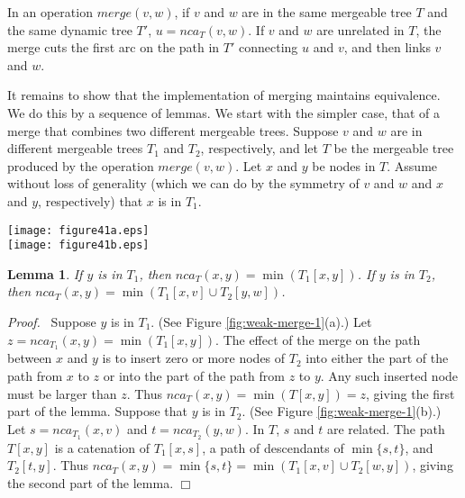 \documentclass[twoside,leqno,twocolumn]{article}
\newtheorem{lemma}{Lemma}
\newcommand{\proof}{\noindent \emph{Proof.}\ }
\newcommand{\proofend}{$\Box$\\}
\newcommand{\merge}{\mathit{merge}}
\newcommand{\nca}{\mathit{nca}}
\newcommand{\rootn}{\mathit{root}}
\begin{document}
In an operation $\merge(v, w)$, if $v$ and $w$ are in the same mergeable tree $T$ and the same dynamic tree $T'$,  $u = \nca_T(v, w)$.  If $v$ and $w$ are unrelated in $T$, the merge cuts the first arc on the path in $T'$ connecting $u$ and $v$, and then links $v$ and $w$.

It remains to show that the implementation of merging maintains equivalence.  We do this by a sequence of lemmas. We start with the simpler case, that of a merge that combines two different mergeable trees.  Suppose $v$ and $w$ are in different mergeable trees $T_1$ and $T_2$, respectively, and let $T$ be the mergeable tree produced by the operation $\merge(v, w)$.  Let $x$ and $y$ be nodes in $T$.  Assume without loss of generality (which we can do by the symmetry of $v$ and $w$ and $x$ and $y$, respectively) that $x$ is in $T_1$.



\begin{figure*}[tb]
\begin{center}
\resizebox{1.\textwidth}{!} {\texttt{[image: figure41a.eps]}}\\
\vspace{1cm} \resizebox{1.\textwidth}{!}
{\texttt{[image: figure41b.eps]}}
\end{center}
\caption{\label{fig:weak-merge-1} Proof of Lemma~\ref{lem:weak1}.  Nodes in the tree containing $v$ are black and nodes in the tree containing $w$ are white. Grey nodes can be either black or white depending on the node labels. Solid lines are single arcs; wavy lines are tree paths. (a) Node $y$ is in $T_1$. Here we assume $t<z<t'<s$.  After the merge, $\min \{v,w\}$ is on $T[t',\max\{v,w\}]$ and $\max \{\rootn(T_1),\rootn(T_2)\}$ is on $T[\min \{\rootn(T_1),\rootn(T_2)\},z]$. (b) Node $y$ is in $T_2$. Here we assume $s<t$.  After the merge, $\min \{v,w\}$ is on $T[s,\max\{v,w\}]$ and $\max \{\rootn(T_1),\rootn(T_2)\}$ is on $T[\min \{\rootn(T_1),\rootn(T_2)\},t]$.}
\end{figure*}


\begin{lemma}
\label{lem:weak1} If $y$ is in $T_1$, then $\nca_T(x, y) = \min(T_1[x,y])$.  If $y$ is in $T_2$, then $\nca_T(x, y) = \min(T_1[x, v] \cup T_2[y, w])$.
\end{lemma}
\proof
Suppose $y$ is in $T_1$. (See Figure \ref{fig:weak-merge-1}(a).) Let $z = \nca_{T_1}(x, y) = \min(T_1[x, y])$. The effect of the merge on the path between $x$ and $y$ is to insert zero or more nodes of $T_2$ into either the part of the path from $x$ to $z$ or into the part of the path from $z$ to $y$.  Any such inserted node must be larger than $z$.  Thus $\nca_{T}(x, y) = \min(T[x, y]) = z$, giving the first part of the lemma.  Suppose that $y$ is in $T_2$. (See Figure \ref{fig:weak-merge-1}(b).) Let $s = nca_{T_1}(x, v)$ and $t = \nca_{T_2}(y, w)$.  In $T$, $s$ and $t$ are related.  The path $T[x,y]$ is a catenation of $T_1[x,s]$, a path of descendants of $\min\{s, t\}$, and $T_2[t,y]$.  Thus $\nca_{T}(x, y) = \min\{s, t\} = \min(T_1[x, v] \cup T_2[w, y])$, giving the second part of the lemma. \proofend
\end{document}
